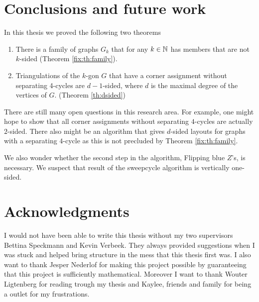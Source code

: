 
\thispagestyle{plain}
\section{Conclusions and future work}

In this thesis we proved the following two theorems

\begin{enumerate}
  \item There is a family of graphs $G_k$ that for any $k \in \mathbb{N}$ has members that are not $k$-sided (Theorem \ref{fix:th:family}).
  \item Triangulations of the $k$-gon $G$ that have a corner assignment without separating 4-cycles are $d-1$-sided, where $d$ is the maximal degree of the vertices of $G$. (Theorem \ref{th:dsided})
\end{enumerate}

There are still many open questions in this research area. For example, one might hope to show that all corner assignments without separating $4$-cycles are actually $2$-sided.
There also might be an algorithm that gives $d$-sided layouts for graphs with a separating $4$-cycle as this is not precluded by Theorem \ref{fix:th:family}.

We also wonder whether the second step in the algorithm, Flipping blue $Z$'s, is necessary.
We suspect that result of the sweepcycle algorithm is vertically one-sided.


\newpage
\thispagestyle{plain}
\section*{Acknowledgments}
I would not have been able to write this thesis without my two supervisors Bettina Speckmann and Kevin Verbeek. They always provided suggestions when I was stuck and helped bring structure in the mess that this thesis first was. I also want to thank Jesper Nederlof for making this project possible by guaranteeing that this project is sufficiently mathematical.
Moreover I want to thank Wouter Ligtenberg for reading trough my thesis and Kaylee, friends and family for being a outlet for my frustrations.
